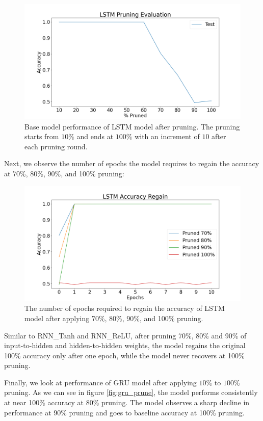 \begin{figure}[h]
	\centering
	\includegraphics[width=0.8\linewidth]{images/results/pruning/lstm_pruning_evaluation.png}
	\caption[LSTM base model performance after pruning]%
	{Base model performance of LSTM model after pruning. The pruning starts from $10\%$ and ends at $100\%$ with an increment of $10$ after each pruning round.}
	\label{fig:lstm_prune}
\end{figure}

Next, we observe the number of epochs the model requires to regain the accuracy at 70\%, 80\%, 90\%, and 100\% pruning:

\begin{figure}[h]
	\centering
	\includegraphics[width=0.8\linewidth]{images/results/pruning/lstm_accuracy_regain.png}
	\caption[LSTM base model performance regain after pruning]%
	{The number of epochs required to regain the accuracy of LSTM model after applying 70\%, 80\%, 90\%, and 100\% pruning.}
	\label{fig:lstm_prune_regain}
\end{figure}

Similar to RNN\_Tanh and RNN\_ReLU, after pruning 70\%, 80\% and 90\% of input-to-hidden and hidden-to-hidden weights, the model regains the original 100\% accuracy only after one epoch, while the model never recovers at 100\% pruning.

Finally, we look at performance of GRU model after applying $10\%$ to $100\%$ pruning. As we can see in figure \ref{fig:gru_prune}, the model performs consistently at near 100\% accuracy at 80\% pruning. The model observes a sharp decline in performance at 90\% pruning and goes to baseline accuracy at 100\% pruning.

